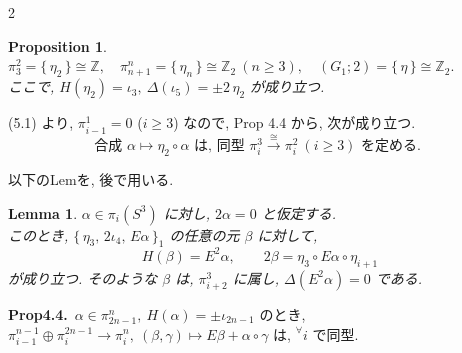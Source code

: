 \documentclass[10pt, leqno]{ltjsarticle}
\newcommand{\todai}[2][]{\{\,#2\,\}_{#1}}      %
\newcommand{\gen}[1]{\{\,#1\,\}}       %
\newcommand{\pit}[2]{\pi_{#1}^{#2}}
\numberwithin{equation}{section}
\theoremstyle{plain}
\newtheorem{lemma}[theorem]{Lemma}
\newtheorem{proposition}[theorem]{Proposition}
\theoremstyle{definition}
\theoremstyle{remark}
\begin{document}
\begin{paracol}{2}

\begin{proposition}\label{prop:5.1}
\(\pi^{2}_{3}=\gen{\eta_2}\cong\mathbb Z,\quad
\pi^{n}_{n+1}=\gen{\eta_n}\cong\mathbb Z_2\ (n\ge3),\quad
(G_1;2)=\gen{\eta}\cong\mathbb Z_2.\) \\
ここで, 
\(H(\eta_2)=\iota_3,\ \Delta(\iota_5)=\pm 2\,\eta_2\) が成り立つ. 
\end{proposition}

(5.1) より,
\(\pi^{1}_{i-1}=0\) (\(i\ge3\)) なので, Prop 4.4 から, 次が成り立つ. 
\begin{equation}\label{eq:5.2}
\text{合成 } \alpha\longmapsto \eta_2\circ \alpha \text{ は, 同型 } 
\pi^{3}_{i}\xrightarrow{\cong}\pi^{2}_{i}\ (i\ge3) 
\text{ を定める. }
\end{equation}

以下のLemを, 後で用いる. 

\begin{lemma}\label{lem:5.2}
\(\alpha\in\pi_{i}(S^{3})\) に対し,
\(2\alpha=0\) と仮定する. \\
このとき,
\(\todai[1]{\eta_3,\,2\iota_4,\,E\alpha}\) 
の任意の元 \(\beta\) に対して,
\[
H(\beta)=E^{2}\alpha,\qquad
2\beta=\eta_3\circ E\alpha\circ \eta_{i+1}
\]
が成り立つ. そのような \(\beta\) は,
\(\pi^{3}_{i+2}\) に属し, \(\Delta(E^{2}\alpha)=0\) である. 
\end{lemma}

\switchcolumn

\noindent
\textbf{Prop4.4.}\
\(\alpha\in \pit{2n-1}{n},\ H(\alpha)=\pm\iota_{2n-1}\) のとき,\\
\(\pit{i-1}{n-1}\oplus\pit{i}{2n-1}\to\pit{i}{n},\ 
(\beta, \gamma)\mapsto E\beta+ \alpha\circ\gamma\)
は, \({}^\forall i\) で同型.


\end{paracol}
\end{document}
